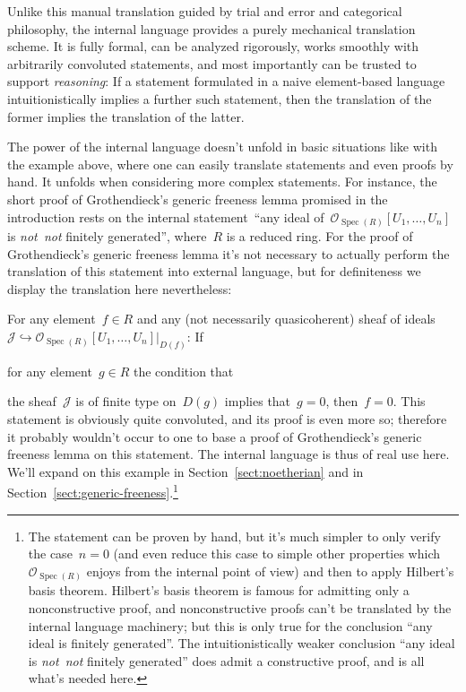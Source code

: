 \documentclass[10pt,reqno,a4paper]{amsbook}
\theoremstyle{definition}
\theoremstyle{plain}
\theoremstyle{remark}
\renewcommand{\O}{\mathcal{O}}
\newcommand{\J}{\mathcal{J}}
\DeclareMathOperator{\Spec}{Spec}
\newcommand{\?}{\,{:}\,}
\renewcommand{\_}{\mathpunct{.}\,}
\newcommand{\notnot}{\emph{not~not}\xspace}
\newenvironment{indentblock}{%
  \list{}{\leftmargin\leftmargin}%
  \item\relax
}{%
  \endlist
}
\begin{document}
Unlike this manual translation guided by trial and error and categorical
philosophy, the internal language provides a purely mechanical translation
scheme.  It is fully formal, can be analyzed rigorously, works smoothly with
arbitrarily convoluted statements, and most importantly can be trusted to
support \emph{reasoning}: If a statement formulated in a naive element-based
language intuitionistically implies a further such statement, then the
translation of the former implies the translation of the latter.

The power of the internal language doesn't unfold in basic situations like with
the example above, where one can easily translate statements and even proofs by
hand. It unfolds when considering more complex statements. For instance, the
short proof of Grothendieck's generic freeness lemma promised in the
introduction rests on the internal statement~``any ideal
of~$\O_{\Spec(R)}[U_1,\ldots,U_n]$ is \notnot finitely generated'',
where~$R$ is a reduced ring. For the proof of Grothendieck's generic freeness
lemma it's not necessary to actually perform the translation of this statement into external
language, but for definiteness we display the translation here nevertheless:
\begin{indentblock}\label{page:convoluted-statement}
For any element~$f \in R$ and any (not necessarily quasicoherent) sheaf of
ideals~$\J \hookrightarrow \O_{\Spec(R)}[U_1,\ldots,U_n]|_{D(f)}$: If
\begin{indentblock}
for any element~$g \in R$ the condition that
\begin{indentblock}
the sheaf~$\J$ is of finite type on~$D(g)$
\end{indentblock}
implies that~$g = 0$,
\end{indentblock}
then~$f = 0$.
\end{indentblock}
This statement is obviously quite convoluted, and its proof is even more so;
therefore it probably wouldn't occur to one to base a proof of Grothendieck's
generic freeness lemma on this statement. The internal language is thus of real
use here. We'll expand on this example in Section~\ref{sect:noetherian} and in
Section~\ref{sect:generic-freeness}.\footnote{The statement can be proven by
hand, but it's much simpler to only verify the case~$n = 0$ (and even reduce
this case to simple other properties which~$\O_{\Spec(R)}$ enjoys from the
internal point of view) and then to apply Hilbert's basis theorem. Hilbert's
basis theorem is famous for admitting only a nonconstructive proof, and
nonconstructive proofs can't be translated by the internal language machinery;
but this is only true for the conclusion ``any ideal is finitely generated''.
The intuitionistically weaker conclusion ``any ideal is \notnot finitely
generated'' does admit a constructive proof, and is all what's needed here.}
\end{document}
